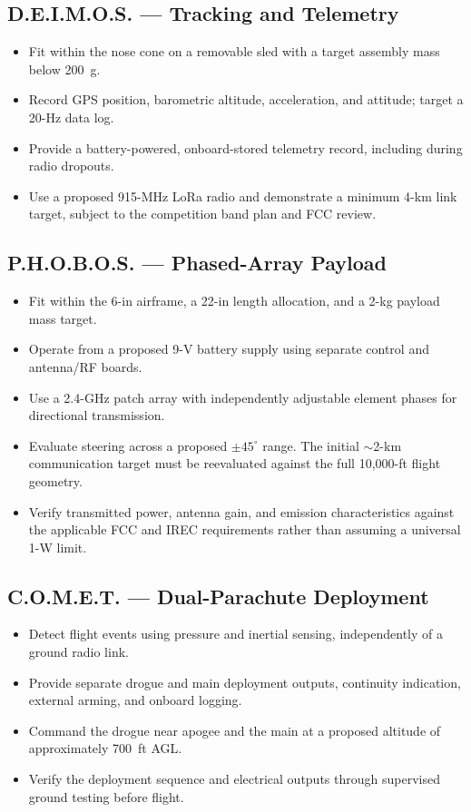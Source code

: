 \documentclass[11pt]{IEEEtran}
\newcommand{\comet}{C.O.M.E.T.}
\newcommand{\phobos}{P.H.O.B.O.S.}
\newcommand{\deimos}{D.E.I.M.O.S.}
\begin{document}
\subsection{\deimos{} --- Tracking and Telemetry}
\begin{itemize}
\item Fit within the nose cone on a removable sled with a target assembly mass below 200~g.
\item Record GPS position, barometric altitude, acceleration, and attitude; target a 20-Hz data log.
\item Provide a battery-powered, onboard-stored telemetry record, including during radio dropouts.
\item Use a proposed 915-MHz LoRa radio and demonstrate a minimum 4-km link target, subject to the competition band plan and FCC review.
\end{itemize}

\subsection{\phobos{} --- Phased-Array Payload}
\begin{itemize}
\item Fit within the 6-in airframe, a 22-in length allocation, and a 2-kg payload mass target.
\item Operate from a proposed 9-V battery supply using separate control and antenna/RF boards.
\item Use a 2.4-GHz patch array with independently adjustable element phases for directional transmission.
\item Evaluate steering across a proposed $\pm45^\circ$ range. The initial $\sim$2-km communication target must be reevaluated against the full 10,000-ft flight geometry.
\item Verify transmitted power, antenna gain, and emission characteristics against the applicable FCC and IREC requirements rather than assuming a universal 1-W limit.
\end{itemize}

\subsection{\comet{} --- Dual-Parachute Deployment}
\begin{itemize}
\item Detect flight events using pressure and inertial sensing, independently of a ground radio link.
\item Provide separate drogue and main deployment outputs, continuity indication, external arming, and onboard logging.
\item Command the drogue near apogee and the main at a proposed altitude of approximately 700~ft AGL.
\item Verify the deployment sequence and electrical outputs through supervised ground testing before flight.
\end{itemize}
\end{document}
